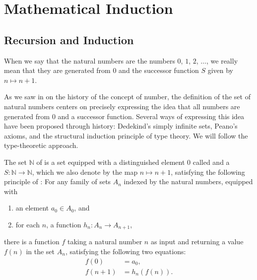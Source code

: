 \chapter{Mathematical Induction}

\section{Recursion and Induction}

When we say that the natural numbers are the numbers $0$, $1$, $2$, $\ldots$, we really mean that they are generated from $0$ and the successor function $S$ given by $n\mapsto n+1$.

As we saw in  on the history of the concept of number, the definition of the set of natural numbers centers on precisely expressing the idea that all numbers are generated from $0$ and a successor function. Several ways of expressing this idea have been proposed through history: Dedekind's simply infinite sets, Peano's axioms, and the structural induction principle of type theory. We will follow the type-theoretic approach.

\begin{definition}
  The set $\mathbb{N}$ of  is a set equipped with a distinguished element $0$ called  and a  $S:\mathbb{N}\to\mathbb{N}$, which we also denote by the map $n\mapsto n+1$, satisfying the following principle of : For any family of sets $A_n$ indexed by the natural numbers, equipped with
  \begin{enumerate}
  \item an element $a_0\in A_0$, and
  \item for each $n$, a function $h_n:A_n\to A_{n+1}$,
  \end{enumerate}
  there is a function $f$ taking a natural number $n$ as input and returning a value $f(n)$ in the set $A_n$, satisfying the following two equations:
  \begin{align*}
    f(0) & = a_0, \\
    f(n+1) & = h_n(f(n)).
  \end{align*}
\end{definition}

